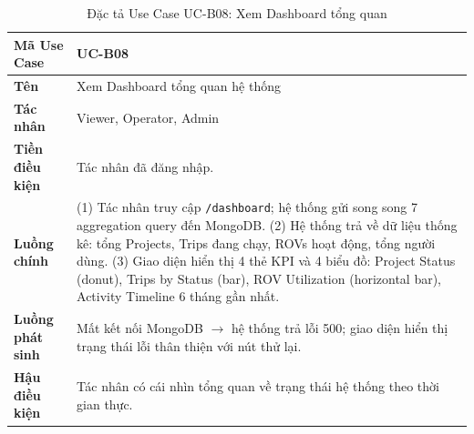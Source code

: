 \documentclass[../DoAn.tex]{subfiles}
\begin{document}
\begin{longtable}{|p{3.5cm}|p{10.0cm}|}
\caption{Đặc tả Use Case UC-B08: Xem Dashboard tổng quan}\label{tab:ucb08}\\
\hline
\textbf{Mã Use Case} & UC-B08 \\
\hline
\textbf{Tên} & Xem Dashboard tổng quan hệ thống \\
\hline
\textbf{Tác nhân} & Viewer, Operator, Admin \\
\hline
\textbf{Tiền điều kiện} & Tác nhân đã đăng nhập. \\
\hline
\textbf{Luồng chính} &
(1) Tác nhân truy cập \texttt{/dashboard}; hệ thống gửi song song 7 aggregation query đến MongoDB. \newline
(2) Hệ thống trả về dữ liệu thống kê: tổng Projects, Trips đang chạy, ROVs hoạt động, tổng người dùng. \newline
(3) Giao diện hiển thị 4 thẻ KPI và 4 biểu đồ: Project Status (donut), Trips by Status (bar), ROV Utilization (horizontal bar), Activity Timeline 6 tháng gần nhất. \\
\hline
\textbf{Luồng phát sinh} & Mất kết nối MongoDB $\to$ hệ thống trả lỗi 500; giao diện hiển thị trạng thái lỗi thân thiện với nút thử lại. \\
\hline
\textbf{Hậu điều kiện} & Tác nhân có cái nhìn tổng quan về trạng thái hệ thống theo thời gian thực. \\
\hline
\end{longtable}
\end{document}

